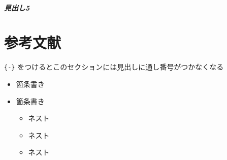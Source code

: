 \hypertarget{ux898bux51faux30575}{%
\subparagraph{見出し5}\label{ux898bux51faux30575}}

\hypertarget{ux53c2ux8003ux6587ux732e}{%
\section*{参考文献}\label{ux53c2ux8003ux6587ux732e}}

\texttt{\{-\}}
をつけるとこのセクションには見出しに通し番号がつかなくなる

\begin{itemize}


\item
  箇条書き
\item
  箇条書き

  \begin{itemize}
  

  \item
    ネスト
  \item
    ネスト
  \item
    ネスト
  \end{itemize}
\end{itemize}
